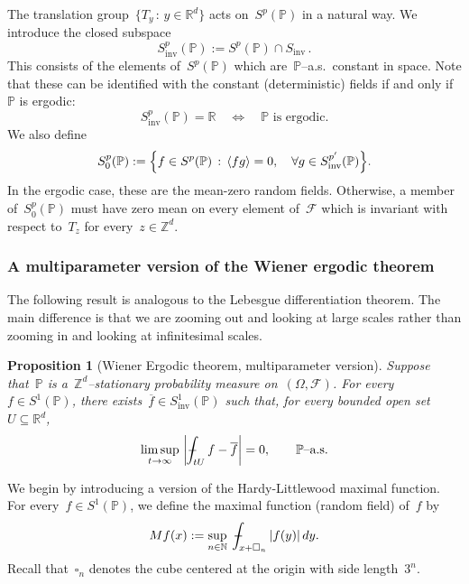 \documentclass[11pt,twoside]{article} %
\let\oldsquare\square %
\renewcommand{\square}{\oldsquare}
\numberwithin{equation}{section}
\newtheorem{proposition}[theorem]{Proposition}
\theoremstyle{definition}
\let\originalleft\left
\let\originalright\right
\renewcommand{\left}{\mathopen{}\mathclose\bgroup\originalleft}
\renewcommand{\right}{\aftergroup\egroup\originalright}
\newcommand*{\N}{\ensuremath{\mathbb{N}}}
\newcommand*{\R}{\ensuremath{\mathbb{R}}}
\newcommand*{\Zd}{\ensuremath{\mathbb{Z}^d}}
\newcommand*{\Rd}{\ensuremath{\mathbb{R}^d}}
\newcommand{\cu}{\square}
\newcommand{\F}{\mathcal{F}}
\renewcommand{\P}{\mathbb{P}}
\def\Xint#1{\mathchoice
{\XXint\displaystyle\textstyle{#1}}%
{\XXint\textstyle\scriptstyle{#1}}%
{\XXint\scriptstyle\scriptscriptstyle{#1}}%
{\XXint\scriptscriptstyle\scriptscriptstyle{#1}}%
\!\int}
\def\XXint#1#2#3{{\setbox0=\hbox{$#1{#2#3}{\int}$}
\vcenter{\hbox{$#2#3$}}\kern-.5\wd0}}
\def\fint{\Xint-}
\begin{document}
\smallskip

The translation group~$\{ T_y \,:\, y\in \Rd \}$ acts on~$S^p(\P)$ in a natural way. We introduce the closed subspace
\begin{equation}
S^p_{\mathrm{inv}}(\P) := S^p(\P) \cap S_{\mathrm{inv}} \,.
\end{equation}
This consists of the elements of~$S^p(\P)$ which are~$\P$--a.s.~constant in space. Note that these can be identified with the constant (deterministic) fields if and only if~$\P$ is ergodic:
\begin{equation}
\label{e.ergodicityduh}
S^p_{\mathrm{inv}}(\P) = \R \quad \iff \quad 
\text{$\P$ is ergodic.}
\end{equation}
We also define
\begin{equation}
S^p_{0}(\P):=
\left\{ f \in S^p(\P) \,:\,  
\left\langle f g \right\rangle = 0, \quad 
\forall g \in S^{p'}_{\mathrm{inv}}(\P)
\right\}.
\end{equation}
In the ergodic case, these are the mean-zero random fields. Otherwise, a member of~$S^p_{0}(\P)$ must have zero mean on every  element of~$\F$ which is invariant with respect to~$T_z$ for every~$z\in\Zd$. 

\subsubsection{A multiparameter version of the Wiener ergodic theorem}
The following result is analogous to the Lebesgue differentiation theorem. The main difference is that we are zooming out and looking at large scales rather than zooming in and looking at infinitesimal scales. 

\begin{proposition}[Wiener Ergodic theorem, multiparameter version]
\label{p.ergodic}
Suppose that~$\P$ is a~$\Zd$--stationary probability measure on~$(\Omega,\F)$. 
For every~$f\in S^1(\P)$, there exists~$\overline{f}\in S^1_{\mathrm{inv}}(\P)$ such that, for every bounded open set~$U\subseteq \Rd$, 
\begin{equation}
\label{e.ergodic}
\limsup_{t\to\infty} \
\left| \fint_{tU} f - \overline{f} \right| = 0, 
\qquad 
\mbox{$\P$--a.s.}
\end{equation}
\end{proposition}


We begin by introducing a version of the Hardy-Littlewood maximal function. For every~$f \in S^1(\P)$, we define the maximal function (random field) of~$f$ by
\begin{equation}
Mf(x) := \sup_{n\in\N} \ \fint_{x+\cu_n} |f(y)|\,dy. 
\end{equation}
Recall that~$\cu_n$ denotes the cube centered at the origin with side length~$3^n$. 
\end{document}
